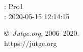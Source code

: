 \documentclass[11pt]{article}
\begin{document}
    \newcommand{\SampleTwoCol}{\SampleTwoColInputOutput{sample-000}{}}
    \newcommand{\SampleOneCol}{\SampleOneColInputOutput{sample-000}{}}

    \ProblemInformation
    \Author: Pro1\\    
    \Generation: 2020-05-15 12:14:15

    \bigskip

    \copyright\ \emph{Jutge.org}, 2006--2020. \\
    https:$/\!\!/$jutge.org
\end{document}
